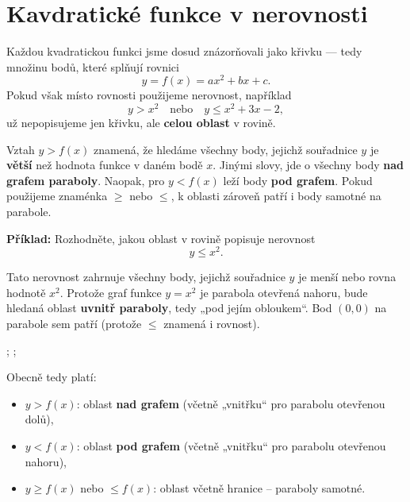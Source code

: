 \documentclass[12pt,a4paper]{article}
\begin{document}
\section{Kavdratické funkce v nerovnosti}

Každou kvadratickou funkci jsme dosud znázorňovali jako křivku — tedy množinu bodů, které splňují rovnici
\[
y = f(x) = ax^2 + bx + c.
\]
Pokud však místo rovnosti použijeme nerovnost, například
\[
y > x^2 \quad \text{nebo} \quad y \le x^2 + 3x - 2,
\]
už nepopisujeme jen křivku, ale \textbf{celou oblast} v rovině.

\medskip
Vztah \(y > f(x)\) znamená, že hledáme všechny body, jejichž souřadnice \(y\) je \textbf{větší} než hodnota funkce v daném bodě \(x\).  
Jinými slovy, jde o všechny body \textbf{nad grafem paraboly}.  
Naopak, pro \(y < f(x)\) leží body \textbf{pod grafem}.  
Pokud použijeme znaménka \(\ge\) nebo \(\le\), k oblasti zároveň patří i body samotné na parabole.

\begin{examplebox}
\textbf{Příklad:}  
Rozhodněte, jakou oblast v rovině popisuje nerovnost
\[
y \le x^2.
\]

Tato nerovnost zahrnuje všechny body, jejichž souřadnice \(y\) je menší nebo rovna hodnotě \(x^2\).  
Protože graf funkce \(y = x^2\) je parabola otevřená nahoru, bude hledaná oblast \textbf{uvnitř paraboly}, tedy „pod jejím obloukem“.  
Bod \((0,0)\) na parabole sem patří (protože \(\le\) znamená i rovnost).

\begin{center}
\begin{axisgraph}[
  xmin=-3, xmax=3,
  ymin=-1, ymax=5,
  samples=200,
  width=9cm,
  height=6cm,
  title={Oblast $y \le x^2$}
]
  ;
   \closedcycle;
\end{axisgraph}
\end{center}
\end{examplebox}


\medskip
\noindent
Obecně tedy platí:

\begin{itemize}
  \item \(y > f(x)\): oblast \textbf{nad grafem} (včetně „vnitřku“ pro parabolu otevřenou dolů),
  \item \(y < f(x)\): oblast \textbf{pod grafem} (včetně „vnitřku“ pro parabolu otevřenou nahoru),
  \item \(y \ge f(x)\) nebo \(\le f(x)\): oblast včetně hranice – paraboly samotné.
\end{itemize}
\end{document}
